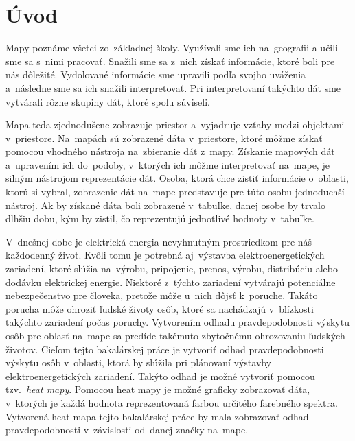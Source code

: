 

\chapter{Úvod}
\label{chap:uvod}
Mapy poznáme všetci zo~základnej školy. Využívali sme ich na~geografii a učili sme sa s~nimi pracovať. Snažili sme sa z~nich získať informácie, ktoré boli pre nás dôležité. Vydolované informácie sme upravili podľa svojho uváženia a~následne sme sa ich snažili interpretovať. Pri interpretovaní takýchto dát sme vytvárali rôzne skupiny dát, ktoré spolu súviseli.

Mapa teda zjednodušene zobrazuje priestor a~vyjadruje vzťahy medzi objektami v~priestore. Na~mapách sú zobrazené dáta v~priestore, ktoré môžme získať pomocou vhodného nástroja na~zbieranie dát z~mapy. Získanie mapových dát a~upravením ich do~podoby, v~ktorých ich môžme interpretovať na~mape, je silným nástrojom reprezentácie dát. Osoba, ktorá chce zistiť informácie o~oblasti, ktorú si vybral, zobrazenie dát na~mape predstavuje pre túto osobu jednoduchší nástroj. Ak by získané dáta boli zobrazené v~tabuľke, danej osobe by trvalo dlhšiu dobu, kým by zistil, čo reprezentujú jednotlivé hodnoty v~tabuľke.

V~dnešnej dobe je elektrická energia nevyhnutným prostriedkom pre náš každodenný život. Kvôli tomu je potrebná aj~výstavba elektroenergetických zariadení, ktoré slúžia na~výrobu, pripojenie, prenos, výrobu, distribúciu alebo dodávku elektrickej energie. Niektoré z~týchto zariadení vytvárajú potenciálne nebezpečenstvo pre človeka, pretože môže u~nich dôjsť k~poruche. Takáto porucha môže ohroziť ľudské životy osôb, ktoré sa nachádzajú v~blízkosti takýchto zariadení počas poruchy. Vytvorením odhadu pravdepodobnosti výskytu osôb pre oblasť na~mape sa predíde takémuto zbytočnému ohrozovaniu ľudských životov. Cieľom tejto bakalárskej práce je vytvoriť odhad pravdepodobnosti výskytu osôb v~oblasti, ktorá by slúžila pri plánovaní výstavby elektroenergetických zariadení. Takýto odhad je možné vytvoriť pomocou tzv.~\emph{heat mapy}. Pomocou heat mapy je možné graficky zobrazovať dáta, v~ktorých je každá hodnota reprezentovaná farbou určitého farebného spektra. Vytvorená heat mapa tejto bakalárskej práce by mala zobrazovať odhad pravdepodobnosti v~závislosti od~danej značky na~mape.

